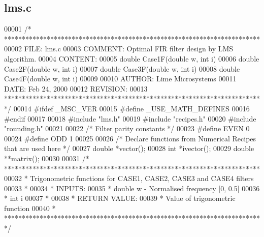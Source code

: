 \subsection{lms.\+c}
\label{lms_8c_source}

\begin{DoxyCode}
00001 \textcolor{comment}{/* ************************************************************************ }
00002 \textcolor{comment}{   FILE:    lms.c}
00003 \textcolor{comment}{   COMMENT: Optimal FIR filter design by LMS algorithm.}
00004 \textcolor{comment}{   CONTENT:}
00005 \textcolor{comment}{        double Case1F(double w, int i)}
00006 \textcolor{comment}{        double Case2F(double w, int i)}
00007 \textcolor{comment}{        double Case3F(double w, int i)}
00008 \textcolor{comment}{        double Case4F(double w, int i)}
00009 \textcolor{comment}{}
00010 \textcolor{comment}{   AUTHOR:  Lime Microsystems}
00011 \textcolor{comment}{   DATE:    Feb 24, 2000}
00012 \textcolor{comment}{   REVISION:}
00013 \textcolor{comment}{   ************************************************************************ */}
00014 \textcolor{preprocessor}{#ifdef \_MSC\_VER}
00015 \textcolor{preprocessor}{#define \_USE\_MATH\_DEFINES}
00016 \textcolor{preprocessor}{#endif }
00017 
00018 \textcolor{preprocessor}{#include "lms.h"}
00019 \textcolor{preprocessor}{#include "recipes.h"}
00020 \textcolor{preprocessor}{#include "rounding.h"}
00021 
00022 \textcolor{comment}{/* Filter parity constants */}
00023 \textcolor{preprocessor}{#define EVEN    0}
00024 \textcolor{preprocessor}{#define ODD     1}
00025 
00026 \textcolor{comment}{/* Declare functions from Numerical Recipes that are used here */}
00027 \textcolor{keywordtype}{double}  *vector();
00028 \textcolor{keywordtype}{int}  *ivector();
00029 \textcolor{keywordtype}{double}  **matrix();
00030     
00031 \textcolor{comment}{/* ************************************************************************ }
00032 \textcolor{comment}{ *  Trigonometric functions for CASE1, CASE2, CASE3 and CASE4 filters}
00033 \textcolor{comment}{ *}
00034 \textcolor{comment}{ *  INPUTS:}
00035 \textcolor{comment}{ *  double  w   - Normalised frequency [0, 0.5]}
00036 \textcolor{comment}{ *  int     i}
00037 \textcolor{comment}{ *}
00038 \textcolor{comment}{ *  RETURN VALUE:}
00039 \textcolor{comment}{ *  Value of trigonometric function}
00040 \textcolor{comment}{ * ************************************************************************ */}

\end{DoxyCode}
